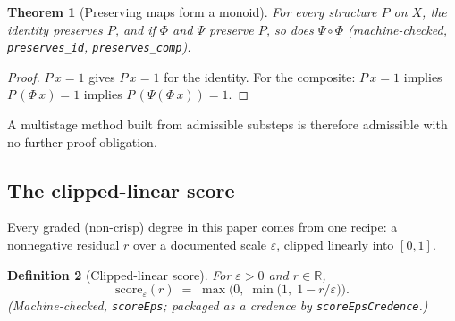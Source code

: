 \documentclass[11pt,a4paper]{article}
\newtheorem{theorem}{Theorem}[section]
\newtheorem{definition}[theorem]{Definition}
\newcommand{\Real}{\mathbb{R}}
\begin{document}
\begin{theorem}[Preserving maps form a monoid]
\label{thm:monoid}
For every structure $P$ on $X$, the identity preserves $P$, and if
$\Phi$ and $\Psi$ preserve $P$, so does $\Psi \circ \Phi$
(machine-checked, \texttt{preserves\_id}, \texttt{preserves\_comp}).
\end{theorem}
\begin{proof}
$P\,x = 1$ gives $P\,x = 1$ for the identity.
For the composite: $P\,x = 1$ implies $P\,(\Phi\,x) = 1$ implies
$P\,(\Psi(\Phi\,x)) = 1$.
\end{proof}

A multistage method built from admissible substeps is therefore
admissible with no further proof obligation.

\subsection{The clipped-linear score}
\label{sec:score}

Every graded (non-crisp) degree in this paper comes from one recipe:
a nonnegative residual $r$ over a documented scale $\varepsilon$,
clipped linearly into $[0,1]$.

\begin{definition}[Clipped-linear score]
\label{def:score}
For $\varepsilon > 0$ and $r \in \Real$,
\[
  \mathrm{score}_\varepsilon(r)
  \;=\; \max\bigl(0,\; \min\bigl(1,\; 1 - r/\varepsilon\bigr)\bigr).
\]
(Machine-checked, \texttt{scoreEps}; packaged as a credence by
\texttt{scoreEpsCredence}.)
\end{definition}
\end{document}
